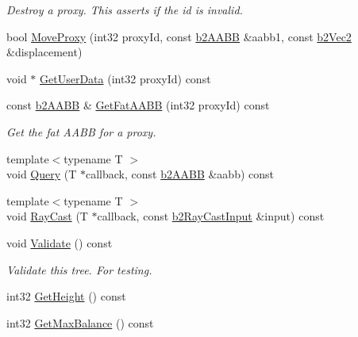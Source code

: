 \begin{DoxyCompactItemize}
\begin{DoxyCompactList}\small\item\em Destroy a proxy. This asserts if the id is invalid. \end{DoxyCompactList}\item 
bool \mbox{\hyperlink{classb2DynamicTree_a7748252811f3c575015931399cbe4daa}{Move\+Proxy}} (int32 proxy\+Id, const \mbox{\hyperlink{structb2AABB}{b2\+A\+A\+BB}} \&aabb1, const \mbox{\hyperlink{structb2Vec2}{b2\+Vec2}} \&displacement)
\item 
void $\ast$ \mbox{\hyperlink{classb2DynamicTree_aa8399f9440707780f267696098e8b920}{Get\+User\+Data}} (int32 proxy\+Id) const
\item 
\mbox{\label{classb2DynamicTree_a655b9ddff43e4e0a34a372eddc03ecb9}} 
const \mbox{\hyperlink{structb2AABB}{b2\+A\+A\+BB}} \& \mbox{\hyperlink{classb2DynamicTree_a655b9ddff43e4e0a34a372eddc03ecb9}{Get\+Fat\+A\+A\+BB}} (int32 proxy\+Id) const
\begin{DoxyCompactList}\small\item\em Get the fat A\+A\+BB for a proxy. \end{DoxyCompactList}\item 
{\footnotesize template$<$typename T $>$ }\\void \mbox{\hyperlink{classb2DynamicTree_a324df3eb65dfc22d3dcdca387737b193}{Query}} (T $\ast$callback, const \mbox{\hyperlink{structb2AABB}{b2\+A\+A\+BB}} \&aabb) const
\item 
{\footnotesize template$<$typename T $>$ }\\void \mbox{\hyperlink{classb2DynamicTree_aebd2dc6ee462e0cd0763a5f472243a13}{Ray\+Cast}} (T $\ast$callback, const \mbox{\hyperlink{structb2RayCastInput}{b2\+Ray\+Cast\+Input}} \&input) const
\item 
\mbox{\label{classb2DynamicTree_ae9b989f0c04e38f9c940623d4e1728b9}} 
void \mbox{\hyperlink{classb2DynamicTree_ae9b989f0c04e38f9c940623d4e1728b9}{Validate}} () const
\begin{DoxyCompactList}\small\item\em Validate this tree. For testing. \end{DoxyCompactList}\item 
int32 \mbox{\hyperlink{classb2DynamicTree_ae3c7dc771d596f1f95fd3a3d7f2f3e97}{Get\+Height}} () const
\item 
int32 \mbox{\hyperlink{classb2DynamicTree_a3feab170229e0acd17f6a4ad3fca406e}{Get\+Max\+Balance}} () const

\end{DoxyCompactItemize}
